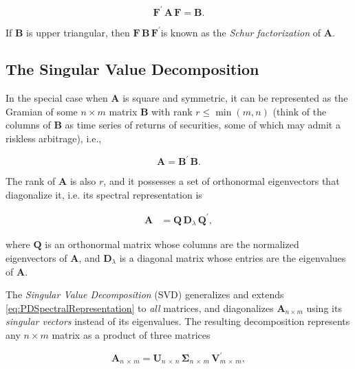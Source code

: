 \documentclass[graybox,envcountchap,sectrefs]{svmono}\usepackage[]{graphicx}\usepackage[]{xcolor}
\begin{document}
\begin{appendices}
\begin{equation}
\mathbf{F}^{\prime}\,\mathbf{A\,}\mathbf{\mathbf{F}}=\mathbf{B}.\label{eq:SimilarMatrices3}
\end{equation}

If $\mathbf{B}$ is upper triangular, then $\mathbf{F}\,\mathbf{B\,\mathbf{F}^{\prime}}$is
known as the \emph{Schur factorization} of $\mathbf{A}$.

\subsection{The Singular Value Decomposition}

In the special case when $\mathbf{A}$ is square and symmetric, it
can be represented as the Gramian of some $n\times m$ matrix $\mathbf{B}$
with rank $r\leqslant\min\left(m,n\right)$ (think of the columns
of $\mathbf{B}$ as time series of returns of securities, some of
which may admit a riskless arbitrage), i.e.,

\begin{equation}
\mathbf{\mathbf{A}}=\mathbf{B}^{\prime}\,\mathbf{B}.\label{eq:GramianOfPD}
\end{equation}

The rank of $\mathbf{\mathbf{A}}$ is also $r$, and it possesses
a set of orthonormal eigenvectors that diagonalize it, i.e. its spectral
representation is

\begin{align}
\mathbf{\mathbf{A}} & =\mathbf{Q}\,\mathbf{D}_{\lambda}\,\mathbf{Q}^{\prime},\label{eq:PDSpectralRepresentation}
\end{align}

where $\mathbf{Q}$ is an orthonormal matrix whose columns are the
normalized eigenvectors of $\mathbf{A}$, and $\mathbf{D}_{\lambda}$
is a diagonal matrix whose entries are the eigenvalues of $\mathbf{A}$.

The \emph{Singular Value Decomposition} (SVD) generalizes and extends
\eqref{eq:PDSpectralRepresentation} to \emph{all} matrices, and diagonalizes
$\mathbf{\mathbf{A}}_{n\times m}$ using its \emph{singular vectors}
instead of its eigenvalues. The resulting decomposition represents
any $n\times m$ matrix as a product of three matrices

\begin{equation}
\mathbf{\mathbf{A}}_{n\,\times\,m}=\mathbf{U}_{n\,\times\,n}\,\mathbf{\Sigma}_{n\,\times\,m}\,\mathbf{V}_{m\,\times\,m}^{\prime},\label{eq:SVD}
\end{equation}


\end{appendices}
\end{document}
